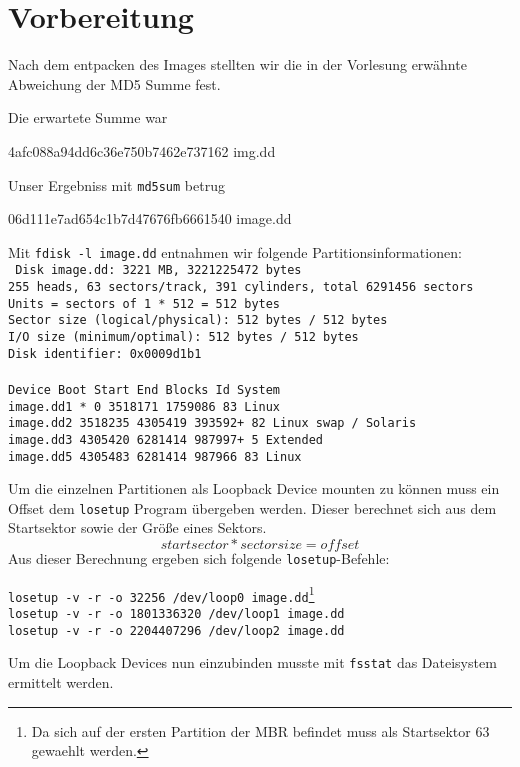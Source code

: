 \section{Vorbereitung}
Nach dem entpacken des Images stellten wir die in der Vorlesung erwähnte Abweichung der MD5 Summe fest.

Die erwartete Summe war
\begin{center}
4afc088a94dd6c36e750b7462e737162  img.dd
\end{center}
Unser Ergebniss mit \texttt{md5sum} betrug
\begin{center}
06d111e7ad654c1b7d47676fb6661540  image.dd
\end{center}
Mit \texttt{fdisk -l image.dd} entnahmen wir folgende Partitionsinformationen:\\

\noindent
\texttt{
Disk image.dd: 3221 MB, 3221225472 bytes\\
255 heads, 63 sectors/track, 391 cylinders, total 6291456 sectors\\
Units = sectors of 1 * 512 = 512 bytes\\
Sector size (logical/physical): 512 bytes / 512 bytes\\
I/O size (minimum/optimal): 512 bytes / 512 bytes\\
Disk identifier: 0x0009d1b1\\
\\Device Boot      Start         End      Blocks   Id  System\\
image.dd1   *           0     3518171     1759086   83  Linux\\
image.dd2         3518235     4305419      393592+  82  Linux swap / Solaris\\
image.dd3         4305420     6281414      987997+   5  Extended\\
image.dd5         4305483     6281414      987966   83  Linux\\}

\lstset{basicstyle=\footnotesize}



Um die einzelnen Partitionen als Loopback Device mounten zu können muss ein Offset dem \texttt{losetup} Program übergeben werden. Dieser berechnet sich aus dem Startsektor sowie der Größe eines Sektors.\[startsector*sectorsize=offset\]
Aus dieser Berechnung ergeben sich folgende \texttt{losetup}-Befehle:
\begin{center}
\texttt{losetup -v -r -o 32256 /dev/loop0 image.dd}\footnote{Da sich auf der ersten Partition der MBR befindet muss als Startsektor 63 gewaehlt werden.}\\
\texttt{losetup -v -r -o 1801336320 /dev/loop1 image.dd}\\
\texttt{losetup -v -r -o 2204407296 /dev/loop2 image.dd}\\
\end{center}

Um die Loopback Devices nun einzubinden musste mit \texttt{fsstat} das Dateisystem ermittelt werden.

